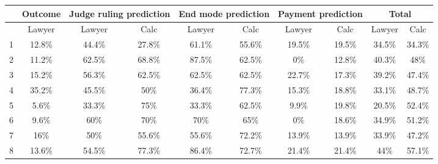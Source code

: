 \begin{tabular}{rccccccccc}
\toprule
      & Outcome & \multicolumn{2}{c}{Judge ruling prediction} & \multicolumn{2}{c}{End mode prediction} & \multicolumn{2}{c}{Payment prediction} & \multicolumn{2}{c}{Total} \\
\midrule
\midrule
      & Lawyer & Lawyer & Calc  & Lawyer & Calc  & Lawyer & Calc  & Lawyer & Calc \\
\midrule
\midrule
1     & 12.8\% & 44.4\% & \cellcolor[rgb]{ .929,  .929,  .929} 27.8\% & 61.1\% & \cellcolor[rgb]{ .929,  .929,  .929} 55.6\% & 19.5\% & \cellcolor[rgb]{ .929,  .929,  .929} 19.5\% & 34.5\% & \cellcolor[rgb]{ .929,  .929,  .929} 34.3\% \\
2     & 11.2\% & 62.5\% & \cellcolor[rgb]{ .929,  .929,  .929} 68.8\% & 87.5\% & \cellcolor[rgb]{ .929,  .929,  .929} 62.5\% & 0\%   & \cellcolor[rgb]{ .929,  .929,  .929} 12.8\% & 40.3\% & \cellcolor[rgb]{ .929,  .929,  .929} 48\% \\
3     & 15.2\% & 56.3\% & \cellcolor[rgb]{ .929,  .929,  .929} 62.5\% & 62.5\% & \cellcolor[rgb]{ .929,  .929,  .929} 62.5\% & 22.7\% & \cellcolor[rgb]{ .929,  .929,  .929} 17.3\% & 39.2\% & \cellcolor[rgb]{ .929,  .929,  .929} 47.4\% \\
4     & 35.2\% & 45.5\% & \cellcolor[rgb]{ .929,  .929,  .929} 50\% & 36.4\% & \cellcolor[rgb]{ .929,  .929,  .929} 77.3\% & 15.3\% & \cellcolor[rgb]{ .929,  .929,  .929} 18.8\% & 33.1\% & \cellcolor[rgb]{ .929,  .929,  .929} 48.7\% \\
5     & 5.6\% & 33.3\% & \cellcolor[rgb]{ .929,  .929,  .929} 75\% & 33.3\% & \cellcolor[rgb]{ .929,  .929,  .929} 62.5\% & 9.9\% & \cellcolor[rgb]{ .929,  .929,  .929} 19.8\% & 20.5\% & \cellcolor[rgb]{ .929,  .929,  .929} 52.4\% \\
6     & 9.6\% & 60\%  & \cellcolor[rgb]{ .929,  .929,  .929} 70\% & 70\%  & \cellcolor[rgb]{ .929,  .929,  .929} 65\% & 0\%   & \cellcolor[rgb]{ .929,  .929,  .929} 18.6\% & 34.9\% & \cellcolor[rgb]{ .929,  .929,  .929} 51.2\% \\
7     & 16\%  & 50\%  & \cellcolor[rgb]{ .929,  .929,  .929} 55.6\% & 55.6\% & \cellcolor[rgb]{ .929,  .929,  .929} 72.2\% & 13.9\% & \cellcolor[rgb]{ .929,  .929,  .929} 13.9\% & 33.9\% & \cellcolor[rgb]{ .929,  .929,  .929} 47.2\% \\
8     & 13.6\% & 54.5\% & \cellcolor[rgb]{ .929,  .929,  .929} 77.3\% & 86.4\% & \cellcolor[rgb]{ .929,  .929,  .929} 72.7\% & 21.4\% & \cellcolor[rgb]{ .929,  .929,  .929} 21.4\% & 44\%  & \cellcolor[rgb]{ .929,  .929,  .929} 57.1\% \\
\bottomrule
\bottomrule
\end{tabular}%
